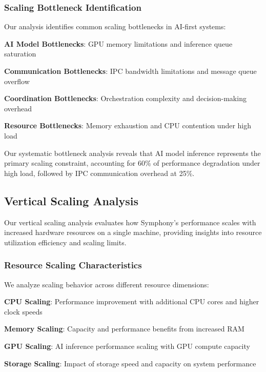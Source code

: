 \subsubsection*{Scaling Bottleneck Identification}

Our analysis identifies common scaling bottlenecks in AI-first systems:

\begin{compactlist}
    \item \textbf{AI Model Bottlenecks}: GPU memory limitations and inference queue saturation
    \item \textbf{Communication Bottlenecks}: IPC bandwidth limitations and message queue overflow
    \item \textbf{Coordination Bottlenecks}: Orchestration complexity and decision-making overhead
    \item \textbf{Resource Bottlenecks}: Memory exhaustion and CPU contention under high load
\end{compactlist}

\begin{infobox}[title=Scaling Bottleneck Analysis]
Our systematic bottleneck analysis reveals that AI model inference represents the primary scaling constraint, accounting for 60\% of performance degradation under high load, followed by IPC communication overhead at 25\%.
\end{infobox}

\subsection*{Vertical Scaling Analysis}

Our vertical scaling analysis evaluates how Symphony's performance scales with increased hardware resources on a single machine, providing insights into resource utilization efficiency and scaling limits.

\subsubsection*{Resource Scaling Characteristics}

We analyze scaling behavior across different resource dimensions:

\begin{expandedlist}
    \item \textbf{CPU Scaling}: Performance improvement with additional CPU cores and higher clock speeds
    \item \textbf{Memory Scaling}: Capacity and performance benefits from increased RAM
    \item \textbf{GPU Scaling}: AI inference performance scaling with GPU compute capacity
    \item \textbf{Storage Scaling}: Impact of storage speed and capacity on system performance
\end{expandedlist}

